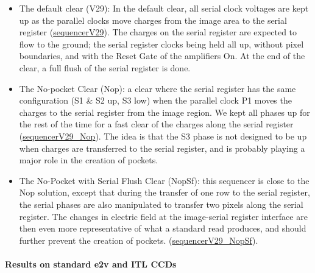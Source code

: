 \begin{itemize}
\tightlist
\item
  The default clear (V29): In the default clear, all serial clock voltages are
  kept up as the parallel clocks move charges from the image area to the
  serial register (\href{https://github.com/lsst-camera-dh/sequencer-files/blob/master/run7/FP_E2V_2s_l3cp_v29.seq}{sequencerV29}).
  The charges on the serial register are expected to flow to the ground;
  the serial register clocks being held all up, without pixel boundaries, and
  with the Reset Gate of the amplifiers On. At the end of the clear, a full
  flush of the serial register is done.
\item
  The No-pocket Clear (Nop): a clear where the serial register has the
  same configuration (S1 \& S2 up, S3 low) when the parallel clock P1
  moves the charges to the serial register from the image region. We kept all phases up for the rest of the time for a fast clear
  of the charges along the serial register
  (\href{https://github.com/lsst-camera-dh/sequencer-files/blob/master/run7/FP_E2V_2s_l3cp_v29_Nop.seq}{sequencerV29\_Nop}). The idea is
  that the S3 phase is not designed to be up when charges are transferred
  to the serial register, and is probably playing a major role in the creation of pockets.
\item
  The No-Pocket with Serial Flush Clear (NopSf): this sequencer is close
  to the Nop solution, except that during the transfer of one row to
  the serial register, the serial phases are also manipulated to transfer two
  pixels along the serial register. The changes in electric field at the
  image-serial register interface are then even more representative of
  what a standard read produces, and should further prevent the
  creation of pockets.
  (\href{https://github.com/lsst-camera-dh/sequencer-files/blob/master/run7/FP_E2V_2s_l3cp_v29_NopSf.seq}{sequencerV29\_NopSf}).
\end{itemize}


\paragraph{Results on standard e2v and ITL CCDs}\label{results-on-standard-e2v-and-itl-ccd}

